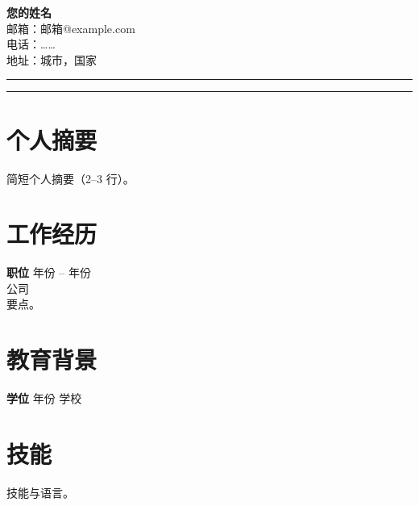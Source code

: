 \documentclass[11pt,a4paper]{article}
\begin{document}
\begin{minipage}[t]{0.72\textwidth}
\vspace{0pt}
{\LARGE \textbf{您的姓名}}\\[0.25em]
邮箱：邮箱@example.com \\
电话：…… \\
地址：城市，国家
\end{minipage}
\begin{minipage}[t]{0.25\textwidth}
\vspace{0pt}
\raggedleft
\rule{2.8cm}{3.2cm}
\end{minipage}

\vspace{0.5em}
\noindent\rule{\textwidth}{0.4pt}

\section*{个人摘要}
简短个人摘要（2--3 行）。

\section*{工作经历}
\textbf{职位} \hfill 年份 -- 年份 \\
公司 \\
要点。

\section*{教育背景}
\textbf{学位} \hfill 年份 \quad 学校

\section*{技能}
技能与语言。
\end{document}
